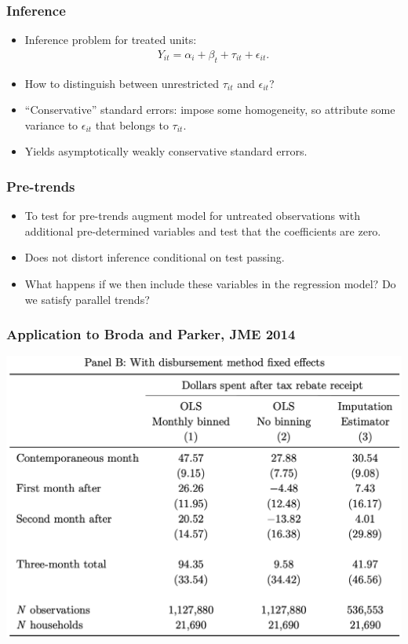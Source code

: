\documentclass[english,xcolor=svgnames]{beamer}
\begin{document}
\begin{frame}
\frametitle[alignment=center]{Inference}
\begin{itemize}
	\item Inference problem for treated units:
	\begin{align*}
			Y_{it} = \alpha_i + \beta_t + \tau_{it} + \epsilon_{it}.
		\end{align*}
	\item How to distinguish between unrestricted $\tau_{it}$ and $\epsilon_{it}$?
	\item ``Conservative'' standard errors: impose some homogeneity, so attribute some variance to $\epsilon_{it}$ that belongs to $\tau_{it}$.
	\item Yields asymptotically weakly conservative standard errors.
\end{itemize}
\end{frame}

\begin{frame}
\frametitle[alignment=center]{Pre-trends}
\begin{itemize}
	\item To test for pre-trends augment model for untreated observations with additional pre-determined variables and test that the coefficients are zero.
	\item Does not distort inference conditional on test passing.
	\item What happens if we then include these variables in the regression model? Do we satisfy parallel trends?
\end{itemize}
\end{frame}


\begin{frame}
\frametitle[alignment=center]{Application to Broda and Parker, JME 2014}
\centering
\includegraphics[scale=0.4]{figures/BJSTAB3a.png}
\end{frame}
\end{document}

